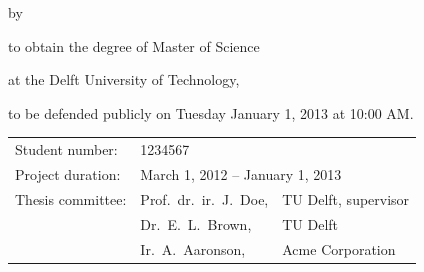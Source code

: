 \begin{titlepage}
    \begin{center}

        {\makeatletter
            \largetitlestyle\fontsize{64}{94}\selectfont\@title
            \makeatother}

        {\makeatletter
            \ifx\@subtitle\undefined\else
                \bigskip
                {\tudsffamily\fontsize{22}{32}\selectfont\@subtitle}
            \fi
            \makeatother}

        \bigskip
        \bigskip

        by

        \bigskip
        \bigskip

        {\makeatletter
            \largetitlestyle\fontsize{26}{26}\selectfont\@author
            \makeatother}

        \bigskip
        \bigskip

        to obtain the degree of Master of Science

        at the Delft University of Technology,

        to be defended publicly on Tuesday January 1, 2013 at 10:00 AM.

        \vfill

        \begin{tabular}{lll}
            Student number:   & 1234567                                                                     \\
            Project duration: & \multicolumn{2}{l}{March 1, 2012 -- January 1, 2013}                        \\
            Thesis committee: & Prof.\ dr.\ ir.\ J.\ Doe,                            & TU Delft, supervisor \\
                              & Dr.\ E.\ L.\ Brown,                                  & TU Delft             \\
                              & Ir.\ A.\ Aaronson,                                   & Acme Corporation
        \end{tabular}


\end{center}
\end{titlepage}
